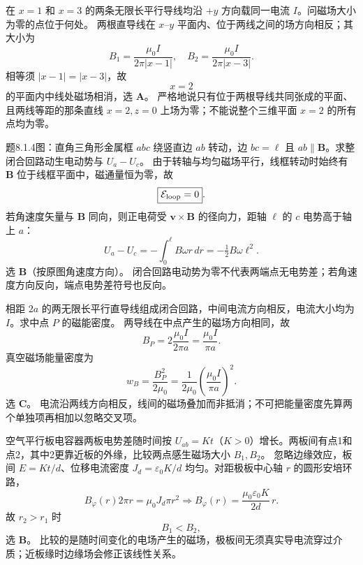 \problemtext 在 $x=1$ 和 $x=3$ 的两条无限长平行导线均沿 $+y$ 方向载同一电流 $I$。问磁场大小为零的点位于何处。
\workings 两根直导线在 $x$--$y$ 平面内、位于两线之间的场方向相反；其大小为
\[B_1=\frac{\mu_0I}{2\pi|x-1|},\quad
B_2=\frac{\mu_0I}{2\pi|x-3|}.\]
相等须 $|x-1|=|x-3|$，故
\[\boxed{x=2}\]
的平面内中线处磁场相消，选 \textbf{A}。
\crosscheck 严格地说只有位于两根导线共同张成的平面、且两线等距的那条直线 $x=2,z=0$ 上场为零；不能说整个三维平面 $x=2$ 的所有点均为零。

\problemtext 题8.1.4图：直角三角形金属框 $abc$ 绕竖直边 $ab$ 转动，边 $bc=\ell$ 且 $ab\parallel\bm B$。求整闭合回路动生电动势与 $U_a-U_c$。
\workings 由于转轴与均匀磁场平行，线框转动时始终有 $\bm B$ 位于线框平面中，磁通量恒为零，故
\[\boxed{\mathcal E_{\rm loop}=0}.\]
若角速度矢量与 $\bm B$ 同向，则正电荷受 $\bm v\times\bm B$ 的径向力，距轴 $\ell$ 的 $c$ 电势高于轴上 $a$：
\[\boxed{U_a-U_c=-\int_0^\ell B\omega r\,dr=-\tfrac12B\omega\ell^2}.\]
选 \textbf{B}（按原图角速度方向）。
\crosscheck 闭合回路电动势为零不代表两端点无电势差；若角速度方向反向，端点电势差符号也反向。

\problemtext 相距 $2a$ 的两无限长平行直导线组成闭合回路，中间电流方向相反，电流大小均为 $I$。求中点 $P$ 的磁能密度。
\workings 两导线在中点产生的磁场方向相同，故
\[B_P=2\frac{\mu_0I}{2\pi a}=\frac{\mu_0I}{\pi a}.\]
真空磁场能量密度为
\[\boxed{w_B=\frac{B_P^2}{2\mu_0}
=\frac1{2\mu_0}\left(\frac{\mu_0I}{\pi a}\right)^2}.\]
选 \textbf{C}。
\crosscheck 电流沿两线方向相反，线间的磁场叠加而非抵消；不可把能量密度先算两个单独项再相加以忽略交叉项。

\problemtext 空气平行板电容器两板电势差随时间按 $U_{ab}=Kt$（$K>0$）增长。两板间有点1和点2，其中2更靠近板的外缘，比较两点感生磁场大小 $B_1,B_2$。
\workings 忽略边缘效应，板间 $E=Kt/d$、位移电流密度 $J_d=\varepsilon_0K/d$ 均匀。对距极板中心轴 $r$ 的圆形安培环路，
\[B_\varphi(r)2\pi r=\mu_0J_d\pi r^2
\Longrightarrow\boxed{B_\varphi(r)=\frac{\mu_0\varepsilon_0 K}{2d}\,r}.\]
故 $r_2>r_1$ 时
\[\boxed{B_1<B_2},\]
选 \textbf{B}。
\crosscheck 比较的是随时间变化的电场产生的磁场，极板间无须真实导电流穿过介质；近板缘时边缘场会修正该线性关系。

